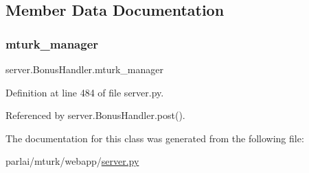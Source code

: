 \subsection{Member Data Documentation}
\mbox{\label{classserver_1_1BonusHandler_a546ed34c4955342e1f0556c43c2a7a38}} 
\subsubsection{\texorpdfstring{mturk\+\_\+manager}{mturk\_manager}}
{\footnotesize\ttfamily server.\+Bonus\+Handler.\+mturk\+\_\+manager}



Definition at line 484 of file server.\+py.



Referenced by server.\+Bonus\+Handler.\+post().



The documentation for this class was generated from the following file\+:\begin{DoxyCompactItemize}
\item 
parlai/mturk/webapp/\hyperlink{server_8py}{server.\+py}\end{DoxyCompactItemize}
